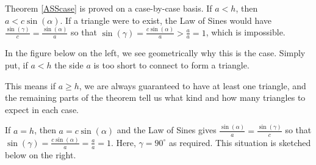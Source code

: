 \documentclass{ximera}
\begin{document}

 

Theorem \ref{ASScase} is proved on a case-by-case basis.   If $a < h$, then $a < c\sin(\alpha)$.  If a triangle were to exist, the Law of Sines would have $\frac{\sin(\gamma)}{c} = \frac{\sin(\alpha)}{a}$ so that $\sin(\gamma) = \frac{c \sin(\alpha)}{a} > \frac{a}{a} =  1$, which is impossible.

 

In the figure below on the left, we see geometrically why this is the case.  Simply put, if $a < h$ the side $a$ is too short to connect to form a triangle. 

 

This means if $a \geq h$, we are always guaranteed to have at least one triangle, and the remaining parts of the theorem tell us what kind and how many triangles to expect in each case.

 

 If $a = h$, then $a = c\sin(\alpha)$ and the Law of Sines gives $\frac{\sin(\alpha)}{a} = \frac{\sin(\gamma)}{c}$ so that $\sin(\gamma) = \frac{c \sin(\alpha)}{a} = \frac{a}{a} = 1$.  Here,  $\gamma = 90^{\circ}$ as required.   This situation is sketched below on the right.
 
  
\end{document}
